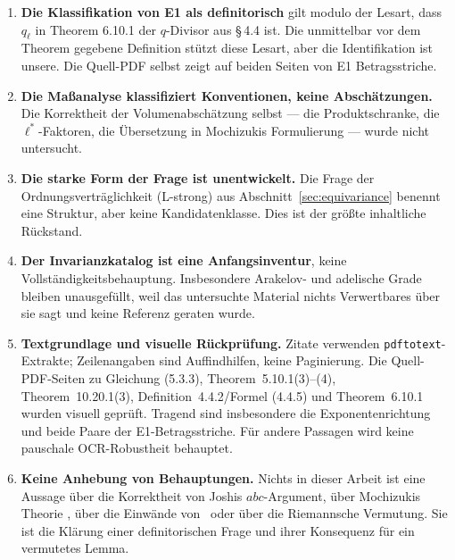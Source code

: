 \documentclass[11pt,a4paper]{article}
\theoremstyle{definition}
\theoremstyle{plain}
\theoremstyle{definition}
\begin{document}
\begin{enumerate}
  $\overline L^*$ und die getrennte ATS~II(1/2)-Aussage auf $L^*$ entscheiden
  weder das gesamte Höhenargument noch einen Fehler in ATS.
\item \textbf{Die Klassifikation von E1 als definitorisch} gilt modulo der Lesart,
  dass $q_\ell$ in Theorem 6.10.1 der
  $q$-Divisor aus \S\,4.4 ist. Die unmittelbar vor dem Theorem gegebene Definition
  stützt diese Lesart, aber die Identifikation ist unsere. Die Quell-PDF selbst
  zeigt auf beiden Seiten von E1 Betragsstriche.
\item \textbf{Die Maßanalyse klassifiziert Konventionen, keine Abschätzungen.} Die
  Korrektheit der Volumenabschätzung selbst --- die Produktschranke, die
  $\ell^*$-Faktoren, die Übersetzung in Mochizukis Formulierung --- wurde nicht
  untersucht.
\item \textbf{Die starke Form der Frage ist unentwickelt.} Die Frage der
  Ordnungsverträglichkeit (L-strong) aus Abschnitt~\ref{sec:equivariance} benennt eine
  Struktur, aber keine Kandidatenklasse. Dies ist der größte inhaltliche Rückstand.
\item \textbf{Der Invarianzkatalog ist eine Anfangsinventur}, keine
  Vollständigkeitsbehauptung. Insbesondere Arakelov- und adelische Grade bleiben
  unausgefüllt, weil das untersuchte Material nichts Verwertbares über sie sagt und
  keine Referenz geraten wurde.
\item \textbf{Textgrundlage und visuelle Rückprüfung.} Zitate verwenden
  \texttt{pdftotext}-Extrakte; Zeilenangaben sind Auffindhilfen, keine Paginierung.
  Die Quell-PDF-Seiten zu Gleichung (5.3.3), Theorem~5.10.1(3)--(4),
  Theorem~10.20.1(3), Definition~4.4.2/Formel (4.4.5) und
  Theorem~6.10.1 wurden visuell geprüft. Tragend sind insbesondere die
  Exponentenrichtung und beide Paare der E1-Betragsstriche. Für andere Passagen
  wird keine pauschale OCR-Robustheit behauptet.
\item \textbf{Keine Anhebung von Behauptungen.} Nichts in dieser Arbeit ist eine
  Aussage über die Korrektheit von Joshis $abc$-Argument, über Mochizukis Theorie
  \cite{Mochizuki2021a,Mochizuki2021b,Mochizuki2021c,Mochizuki2021d}, über die
  Einwände von~\cite{ScholzeStix2018} oder über die Riemannsche Vermutung. Sie ist
  die Klärung einer definitorischen Frage und ihrer Konsequenz für ein vermutetes
  Lemma.
\end{enumerate}
\end{document}
